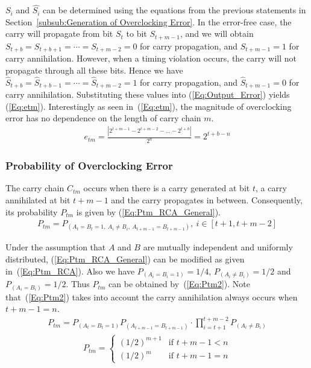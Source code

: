 \documentclass[prodmode,acmtrets]{acmsmall} %
\begin{document}
$S_i$ and $\hat{S_i}$ can be determined using the equations from the previous statements in Section~\ref{subsub:Generation of Overclocking Error}. In the error-free case, the carry will propagate from bit $S_t$ to bit $S_{t+m-1}$, and we will obtain $S_{t+b}=S_{t+b+1}=\cdots=S_{t+m-2}=0$ for carry propagation, and $S_{t+m-1}=1$ for carry annihilation. However, when a timing violation occurs, the carry will not propagate through all these bits. Hence we have $\hat{S}_{t+b}=\hat{S}_{t+b-1}=\cdots=\hat{S}_{t+m-2}=1$ for carry propagation, and $\hat{S}_{t+m-1}=0$ for carry annihilation. Substituting these values into (\ref{Eq:Output_Error}) yields (\ref{Eq:etm}). Interestingly as seen in~(\ref{Eq:etm}), the magnitude of overclocking error has no dependence on the length of carry chain $m$.
%
\begin{eqnarray}\label{Eq:etm}
    e_{tm} = \frac{\left|2^{t+m-1}-2^{t+m-2}-\dots-2^{t+b}\right|}{2^n} = 2^{t+b-n}
\end{eqnarray}

\subsubsection{Probability of Overclocking Error}
The carry chain $C_{tm}$ occurs when there is a carry generated at bit $t$, a carry annihilated at bit $t+m-1$ and the carry propagates in between. Consequently, its probability $P_{tm}$ is given by (\ref{Eq:Ptm_RCA_General}).
%
\begin{eqnarray}\label{Eq:Ptm_RCA_General}
    P_{tm}=P_{(A_t=B_t=1,~A_i\neq B_i,~A_{t+m-1}=B_{t+m-1})},~i\in [t+1,t+m-2]
\end{eqnarray}

Under the assumption that $A$ and $B$ are mutually independent and uniformly distributed, (\ref{Eq:Ptm_RCA_General}) can be modified as given in~(\ref{Eq:Ptm_RCA}). Also we have $P_{(A_i=B_i=1)}=1/4$, $P_{(A_i\neq B_i)}=1/2$ and $P_{(A_i=B_i)}=1/2$. Thus $P_{tm}$ can be obtained by~(\ref{Eq:Ptm2}). Note that~(\ref{Eq:Ptm2}) takes into account the carry annihilation always occurs when $t+m-1=n$.
%
\begin{eqnarray}\label{Eq:Ptm_RCA}
  P_{tm}=P_{(A_t=B_t=1)}P_{(A_{t+m-1}=B_{t+m-1})}\cdot \prod_{i=t+1}^{t+m-2}P_{(A_i\neq B_i)}
\end{eqnarray}
%
\begin{eqnarray}\label{Eq:Ptm2}
    P_{tm}=\left\{\begin{array}{ll}
      (1/2)^{m+1} & \textrm{if $t+m-1<n$}\\
      (1/2)^{m} & \textrm{if $t+m-1=n$}
    \end{array} \right.
\end{eqnarray}
\end{document}
